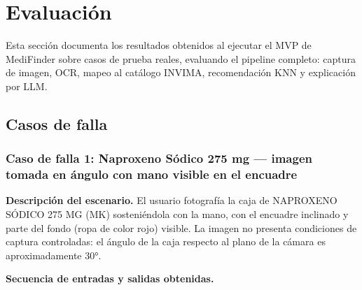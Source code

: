\section{Evaluación}

Esta sección documenta los resultados obtenidos al ejecutar el MVP de MediFinder sobre casos de prueba reales, evaluando el pipeline completo: captura de imagen, OCR, mapeo al catálogo INVIMA, recomendación KNN y explicación por LLM.


\subsection{Casos de falla}
\subsubsection*{Caso de falla 1: Naproxeno Sódico 275 mg --- imagen tomada en ángulo con mano visible en el encuadre}

\textbf{Descripción del escenario.}
El usuario fotografía la caja de NAPROXENO SÓDICO 275 MG (MK) sosteniéndola con la mano, con el encuadre inclinado y parte del fondo (ropa de color rojo) visible. La imagen no presenta condiciones de captura controladas: el ángulo de la caja respecto al plano de la cámara es aproximadamente 30°.

\textbf{Secuencia de entradas y salidas obtenidas.}

